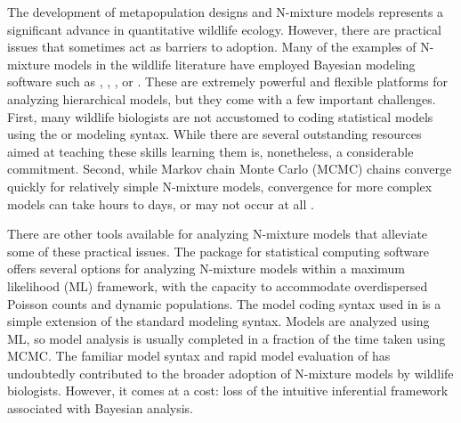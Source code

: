 \documentclass[codesnippet]{jss}
\begin{document}
The development of metapopulation designs and N-mixture models represents a significant advance in quantitative wildlife ecology. However, there are practical issues that sometimes act as barriers to adoption. Many of the examples of N-mixture models in the wildlife literature have employed Bayesian modeling software such as , , , or   \citep{plummer2003jags,Lunn_Jackson_Best_Thomas_Spiegelhalter_2012,Carpenter_Gelman_Hoffman_Lee_et_al_2017}. These are extremely powerful and flexible platforms for analyzing hierarchical models, but they come with a few important challenges. First, many wildlife biologists are not accustomed to coding statistical models using the  or  modeling syntax. While there are several outstanding resources aimed at teaching these skills  \citep{Royle_Dorazio_2008, Kery_2010, Kery_Schaub_2011, Kery_Royle_2015, Korner-Nievergelt_Roth_et_al_2015} learning them is, nonetheless, a considerable commitment. Second, while Markov chain Monte Carlo (MCMC) chains converge quickly for relatively simple N-mixture models, convergence for more complex models can take hours to days, or may not occur at all \citep{Kery_Schaub_2011}.

There are other tools available for analyzing N-mixture models that 
alleviate some of these practical issues. The  package 
\citep{Fiske_Chandler_2011} for  statistical computing software 
\citep{R_Core_Team_2016} offers several options for analyzing N-mixture 
models within a maximum likelihood (ML) framework, with the capacity to 
accommodate overdispersed Poisson counts and dynamic populations. The model 
coding syntax used in  is a simple extension of the standard 
 modeling syntax. Models are analyzed using ML, so model 
analysis is usually completed in a fraction of the time taken using MCMC. 
The familiar model syntax and rapid model evaluation of  has 
undoubtedly contributed to the broader adoption of N-mixture models by 
wildlife biologists. However, it comes at a cost: loss of the intuitive 
inferential framework associated with Bayesian analysis.
\end{document}
